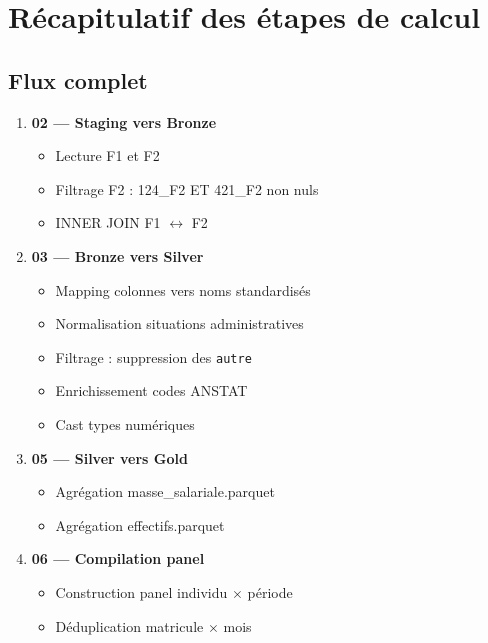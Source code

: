 \documentclass[12pt,a4paper,french]{article}
\begin{document}
\section{Récapitulatif des étapes de calcul}

\subsection{Flux complet}

\begin{enumerate}
    \item \textbf{02 — Staging vers Bronze}
          \begin{itemize}
              \item Lecture F1 et F2
              \item Filtrage F2 : 124\_F2 ET 421\_F2 non nuls
              \item INNER JOIN F1 $\leftrightarrow$ F2
          \end{itemize}

    \item \textbf{03 — Bronze vers Silver}
          \begin{itemize}
              \item Mapping colonnes vers noms standardisés
              \item Normalisation situations administratives
              \item Filtrage : suppression des \texttt{autre}
              \item Enrichissement codes ANSTAT
              \item Cast types numériques
          \end{itemize}

    \item \textbf{05 — Silver vers Gold}
          \begin{itemize}
              \item Agrégation masse\_salariale.parquet
              \item Agrégation effectifs.parquet
          \end{itemize}

    \item \textbf{06 — Compilation panel}
          \begin{itemize}
              \item Construction panel individu $\times$ période
              \item Déduplication matricule $\times$ mois
          \end{itemize}


\end{enumerate}
\end{document}
